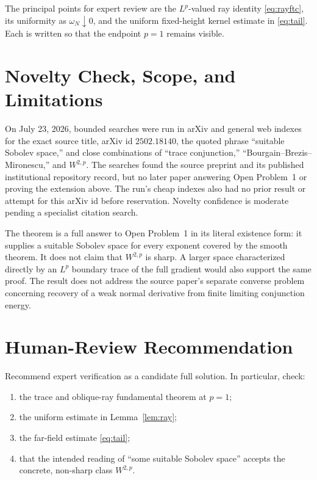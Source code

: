 \documentclass[11pt]{article}
\begin{document}
The principal points for expert review are the \(L^p\)-valued ray identity
\eqref{eq:rayftc}, its uniformity as \(\omega_N\downarrow0\), and the
uniform fixed-height kernel estimate in \eqref{eq:tail}.  Each is written
so that the endpoint \(p=1\) remains visible.

\section*{Novelty Check, Scope, and Limitations}

On July 23, 2026, bounded searches were run in arXiv and general web
indexes for the exact source title, arXiv id \(2502.18140\), the quoted
phrase ``suitable Sobolev space,'' and close combinations of ``trace
conjunction,'' ``Bourgain--Brezis--Mironescu,'' and \(W^{2,p}\).
The searches found the source preprint and its published institutional
repository record, but no later paper answering Open Problem~1 or proving
the extension above.  The run's cheap indexes also had no prior result or
attempt for this arXiv id before reservation.  Novelty confidence is
moderate pending a specialist citation search.

The theorem is a full answer to Open Problem~1 in its literal existence
form: it supplies a suitable Sobolev space for every exponent covered by
the smooth theorem.  It does not claim that \(W^{2,p}\) is sharp.  A larger
space characterized directly by an \(L^p\) boundary trace of the full
gradient would also support the same proof.  The result does not address
the source paper's separate converse problem concerning recovery of a
weak normal derivative from finite limiting conjunction energy.

\section*{Human-Review Recommendation}

Recommend expert verification as a candidate full solution.  In
particular, check:
\begin{enumerate}
\item the trace and oblique-ray fundamental theorem at \(p=1\);
\item the uniform estimate in Lemma~\ref{lem:ray};
\item the far-field estimate \eqref{eq:tail};
\item that the intended reading of ``some suitable Sobolev space'' accepts
the concrete, non-sharp class \(W^{2,p}\).
\end{enumerate}
\end{document}
